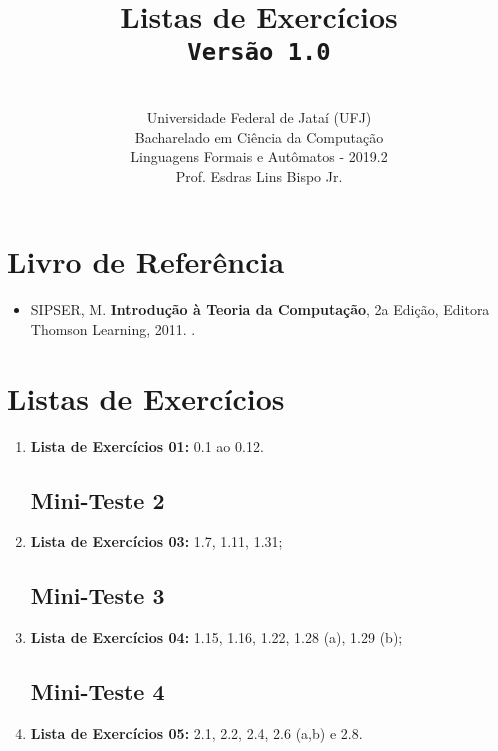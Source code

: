 \documentclass[12pt,a4paper,oneside]{article}
\author{\\Universidade Federal de Jataí (UFJ)\\Bacharelado em Ciência da Computação \\Linguagens Formais e Autômatos - 2019.2 \\Prof. Esdras Lins Bispo Jr.}
\date{}
\title{
	\sc \huge Listas de Exercícios
	\\{\tt Versão 1.0}
}
\begin{document}
\maketitle

\section{Livro de Referência}
	\begin{itemize}
		\item SIPSER, M. {\bf Introdução à Teoria da Computação}, 2a Edição, Editora Thomson Learning, 2011. \color{blue}{\bf Código Bib.: [004 SIP/int]}.
	\end{itemize}
	
\section{Listas de Exercícios}

\begin{enumerate}

	\subsection{Mini-Teste 1}
	\item[] {\bf Lista de Exercícios 01:} 0.1 ao 0.12.
	
	\subsection{Mini-Teste 2}
	\item[] {\bf Lista de Exercícios 03:} 1.7, 1.11, 1.31;
	
	\subsection{Mini-Teste 3}
	\item[] {\bf Lista de Exercícios 04:} 1.15, 1.16, 1.22, 1.28 (a), 1.29 (b);
	
	\subsection{Mini-Teste 4}
	\item[] {\bf Lista de Exercícios 05:} 2.1, 2.2, 2.4, 2.6 (a,b) e 2.8.
	
\end{enumerate}
\end{document}

